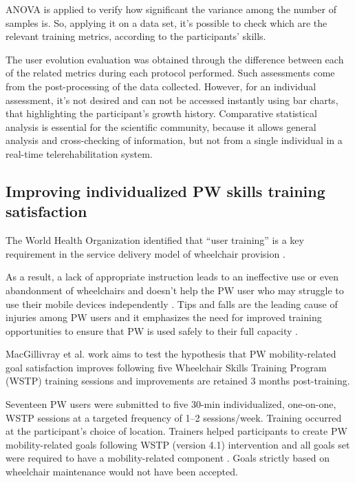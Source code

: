 ANOVA is applied to verify how significant the variance among the number of samples is.  So, applying it on a data set, it's possible to check which are the relevant training metrics, according to the participants' skills. 

The user evolution evaluation was obtained through the difference between each of the related metrics during each protocol performed. Such assessments come from the post-processing of the data collected. However, for an individual assessment, it's not desired and can not be accessed instantly using bar charts, that highlighting the participant's growth history. Comparative statistical analysis is essential for the scientific community, because it allows general analysis and cross-checking of information, but not from a single individual in a real-time telerehabilitation system.


\subsection{Improving individualized PW skills training satisfaction}
The World Health Organization identified that ``user training'' is a key requirement in the service delivery model of wheelchair provision \cite{who2008}. 

As a result, a lack of appropriate instruction leads to an ineffective use or even abandonment of wheelchairs and doesn't help the PW user who may struggle to use their mobile devices independently \cite{pettersson2014}. Tips and falls are the leading cause of injuries among PW users and it emphasizes the need for improved training opportunities to ensure that PW is used safely to their full capacity \cite{gaal1997,xiang2006}.

MacGillivray et al. \cite{macgillivray2018} work aims to test the hypothesis that PW mobility-related goal satisfaction improves following five Wheelchair Skills Training Program (WSTP) training sessions and improvements are retained 3 months post-training.

Seventeen PW users were submitted to five 30-min individualized, one-on-one, WSTP sessions at a targeted frequency of 1–2 sessions/week. Training occurred at the participant’s choice of location. Trainers helped participants to create PW mobility-related goals following  WSTP (version 4.1)  intervention and all goals set were required to have a mobility-related component \cite{kirby2008}.  Goals strictly based on wheelchair maintenance would not have been accepted.

